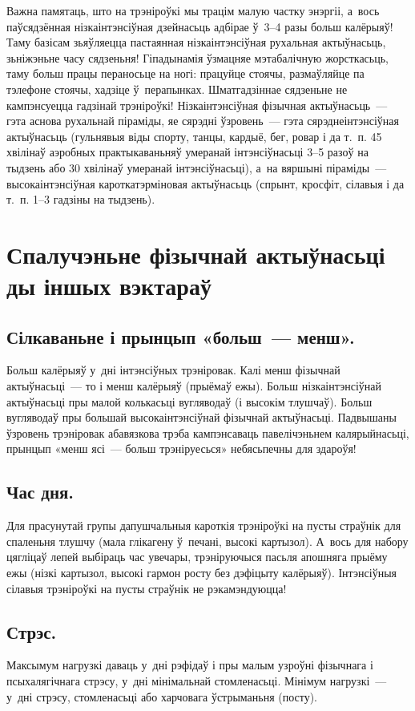Важна памятаць, што на трэніроўкі мы трацім малую частку энэргіі, а~вось паўсядзённая нізкаінтэнсіўная дзейнасьць адбірае ў~3--4 разы больш калёрыяў! Таму базісам зьяўляецца пастаянная нізкаінтэнсіўная рухальная актыўнасьць, зьніжэньне часу сядзеньня! Гіпадынамія ўзмацняе мэтабалічную жорсткасьць, таму больш працы пераносьце на ногі: працуйце стоячы, размаўляйце па тэлефоне стоячы, хадзіце ў~перапынках. Шматгадзіннае сядзеньне не кампэнсуецца гадзінай трэніроўкі! Нізкаінтэнсіўная фізычная актыўнасьць~--- гэта аснова рухальнай піраміды, яе сярэдні ўзровень~--- гэта сярэднеінтэнсіўная актыўнасьць (гульнявыя віды спорту, танцы, кардыё, бег, ровар і да т.~п. 45 хвілінаў аэробных практыкаваньняў умеранай інтэнсіўнасьці 3--5 разоў на тыдзень або 30 хвілінаў умеранай інтэнсіўнасьці), а~на вяршыні піраміды~--- высокаінтэнсіўная кароткатэрміновая актыўнасьць (спрынт, кросфіт, сілавыя і да т.~п. 1--3 гадзіны на тыдзень).

\section{Спалучэньне фізычнай актыўнасьці ды іншых вэктараў}

\subsection{Сілкаваньне і прынцып «больш~--- менш».}
Больш калёрыяў у~дні інтэнсіўных трэніровак. Калі менш фізычнай актыўнасьці~--- то і менш калёрыяў (прыёмаў ежы). Больш нізкаінтэнсіўнай актыўнасьці пры малой колькасьці вугляводаў (і высокім тлушчаў). Больш вугляводаў пры большай высокаінтэнсіўнай фізычнай актыўнасьці. Падвышаны ўзровень трэніровак абавязкова трэба кампэнсаваць павелічэньнем калярыйнасьці, прынцып «менш ясі~--- больш трэніруесься» небясьпечны для здароўя!

\subsection{Час дня.}
Для прасунутай групы дапушчальныя кароткія трэніроўкі на пусты страўнік для спаленьня тлушчу (мала глікагену ў~печані, высокі картызол). А~вось для набору цягліцаў лепей выбіраць час увечары, трэніруючыся пасьля апошняга прыёму ежы (нізкі картызол, высокі гармон росту без дэфіцыту калёрыяў). Інтэнсіўныя сілавыя трэніроўкі на пусты страўнік не рэкамэндуюцца!

\subsection{Стрэс.}
Максымум нагрузкі даваць у~дні рэфідаў і пры малым узроўні фізычнага і псыхалягічнага стрэсу, у~дні мінімальнай стомленасьці. Мінімум нагрузкі~--- у~дні стрэсу, стомленасьці або харчовага ўстрыманьня (посту).

